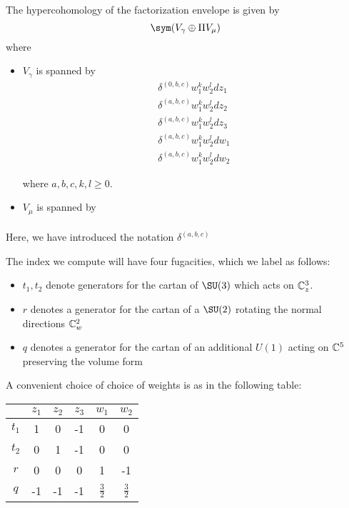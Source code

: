 \begin{lem}
  The hypercohomology of the factorization envelope is given by \[\sym (V_{\gamma}\oplus \Pi V_{\mu})\] where
  \begin{itemize}
    \item $V_{\gamma}$ is spanned by
          \begin{align}
            \delta^{(0,b,c)}w_{1}^{k}w_{2}^{l}dz_{1} \\
            \delta^{(a,b,c)}w_{1}^{k}w_{2}^{l}dz_{2} \\
            \delta^{(a,b,c)}w_{1}^{k}w_{2}^{l}dz_{3} \\
            \delta^{(a,b,c)}w_{1}^{k}w_{2}^{l}dw_{1}\\
            \delta^{(a,b,c)}w_{1}^{k}w_{2}^{l}dw_{2}
          \end{align}

          where $a, b, c, k, l \geq 0$.
    \item $V_{\mu}$ is spanned by
          \begin{align}

          \end{align}
  \end{itemize}
\end{lem}

Here, we have introduced the notation $\delta^{(a,b,c)}$

The index we compute will have four fugacities, which we label as follows:
\begin{itemize}
  \item $t_{1}, t_{2}$ denote generators for the cartan of $\SU(3)$ which acts on $\mathbb{C}^{3}_{z}$.
  \item $r$ denotes a generator for the cartan of a $\SU(2)$ rotating the normal directions $\mathbb{C}^{2}_{w}$
  \item $q$ denotes a generator for the cartan of an additional $U(1)$ acting on $\mathbb{C}^{5}$ preserving the volume form
\end{itemize}

A convenient choice of choice of weights is as in the following table:

\begin{center}
\begin{tabular}{c c c c c c}
  & $z_{1}$ & $z_{2}$ & $z_{3}$ & $w_{1}$ & $w_{2}$ \\
  \hline
  $t_{1}$ & 1 & 0 & -1 & 0 & 0 \\
  $t_{2}$ & 0 & 1 & -1 & 0 & 0 \\
  $r$ & 0 & 0 & 0 & 1 & -1 \\
  $q$ & -1 & -1 & -1 & $\frac{3}{2}$ & $\frac{3}{2}$
\end{tabular}
\end{center}
